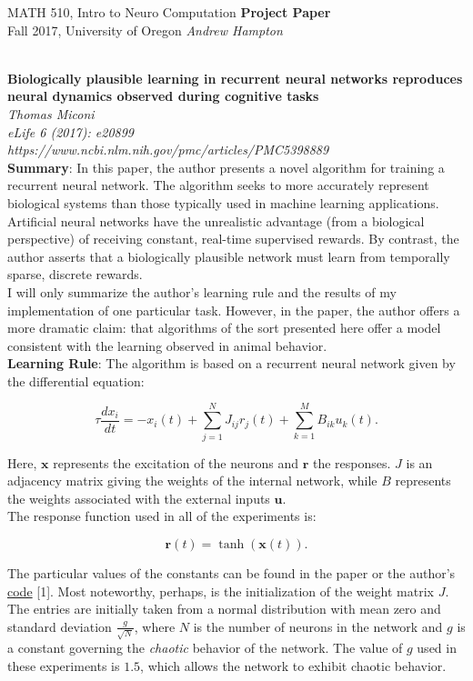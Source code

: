 \documentclass{article}
\newcommand{\courseNumber}{MATH 510}
\newcommand{\courseTitle}{Intro to Neuro Computation}
\newcommand{\semester}{Fall 2017}
\theoremstyle{plain}
\theoremstyle{definition}
\theoremstyle{remark}
\newcommand{\solutions}[2]{
\vspace{-2ex}
\begin{center}
{\small  \courseNumber, \courseTitle
\hfill {\large \bf {#1} }\\
\semester, University of Oregon \hfill
{\em Andrew Hampton}}\\
\vspace{-1ex}
\hrulefill\\
\vspace{4ex}
\end{center}
}
\begin{document}
\solutions{Project Paper}{December 5, 2017}

\textbf{Biologically plausible learning in recurrent neural networks reproduces neural dynamics observed during cognitive tasks} \\
\textit{Thomas Miconi} \\
\textit{eLife 6 (2017): e20899} \\
\textit{https://www.ncbi.nlm.nih.gov/pmc/articles/PMC5398889} \\

\textbf{Summary}: In this paper, the author presents a novel algorithm for training a recurrent neural network. The algorithm seeks to more accurately represent biological systems than those typically used in machine learning applications. Artificial neural networks have the unrealistic advantage (from a biological perspective) of receiving constant, real-time supervised rewards. By contrast, the author asserts that a biologically plausible network must learn from temporally sparse, discrete rewards. \\

I will only summarize the author's learning rule and the results of my implementation of one particular task. However, in the paper, the author offers a more dramatic claim: that algorithms of the sort presented here offer a model consistent with the learning observed in animal behavior. \\

\textbf{Learning Rule}: The algorithm is based on a recurrent neural network given by the differential equation:

$$
\tau \frac{dx_i}{dt} = -x_i(t) + \sum^N_{j=1}J_{ij}r_j(t) + \sum^M_{k=1}B_{ik}u_k(t).
$$

Here, $\mathbf{x}$ represents the excitation of the neurons and $\mathbf{r}$ the responses. $J$ is an adjacency matrix giving the weights of the internal network, while $B$ represents the weights associated with the external inputs $\mathbf{u}$. \\

The response function used in all of the experiments is:

$$
\mathbf{r}(t) = \tanh(\mathbf{x}(t)).
$$

The particular values of the constants can be found in the paper or the author's \href{https://www.github.com/ThomasMiconi/BiologicallyPlausibleLearningRNN}{code} [1]. Most noteworthy, perhaps, is the initialization of the weight matrix $J$. The entries are initially taken from a normal distribution with mean zero and standard deviation $\frac{g}{\sqrt{N}}$, where $N$ is the number of neurons in the network and $g$ is a constant governing the \textit{chaotic} behavior of the network. The value of $g$ used in these experiments is $1.5$, which allows the network to exhibit chaotic behavior. \\
\end{document}
